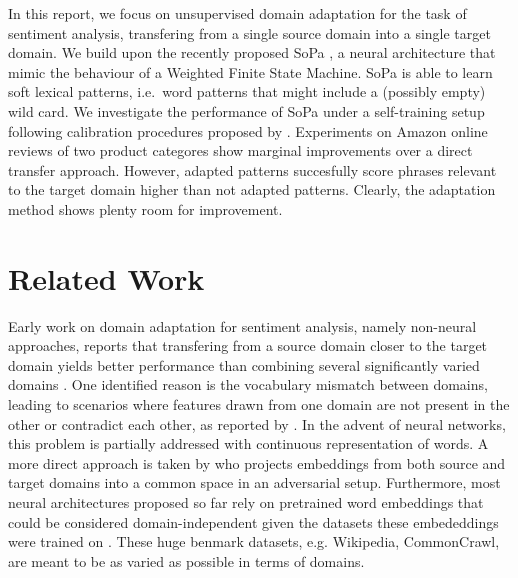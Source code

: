 \documentclass[11pt,a4paper]{article}
\begin{document}
In this report, we focus on unsupervised domain adaptation for the task of sentiment analysis, transfering from a single source domain into a single target domain.
We build upon the recently proposed {\sc SoPa} \cite{schwartz2018sopa}, a neural architecture that mimic the behaviour of a Weighted Finite State Machine.
{\sc SoPa} is able to learn soft lexical patterns, i.e.\ word patterns that might include a (possibly empty) wild card.
We investigate the performance of {\sc SoPa} under a self-training setup following calibration procedures proposed by \citet{ruder2018strong}.
Experiments on Amazon online reviews of two product categores show marginal improvements over a direct transfer approach.
However, adapted patterns succesfully score phrases relevant to the target domain higher than not adapted patterns. 
Clearly, the adaptation method shows plenty room for improvement.





\section{Related Work}

Early work on domain adaptation for sentiment analysis, namely non-neural approaches, reports that transfering from a source domain closer to the target domain yields better performance than combining several significantly varied domains \cite{blitzer2007biographies,aue2005customizing}.
One identified reason is the vocabulary mismatch between domains, leading to scenarios where features drawn from one domain are not present in the other or contradict each other, as reported by \citet{blitzer2007biographies}.
In the advent of neural networks, this problem is partially addressed with continuous representation of words. A more direct approach is taken by \citet{barnes2018projecting} who projects embeddings from both source and target domains into a common space in an adversarial setup.
Furthermore, most neural architectures proposed so far rely on pretrained word embeddings that could be considered domain-independent given the datasets these embededdings were trained on \cite{pennington2014glove,Peters:2018}. These huge benmark datasets, e.g. Wikipedia, CommonCrawl, are meant to be as varied as possible in terms of domains.
\end{document}
